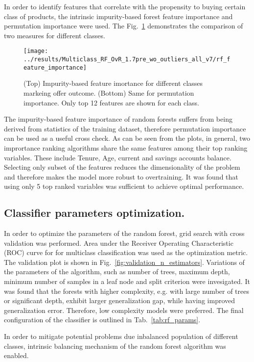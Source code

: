 \documentclass[14pt]{scrartcl}
\begin{document}
In order to identify features that correlate with the propensity to buying certain
class of products, the intrinsic impurity-based forest feature importance and permutation
importance were used. The Fig.~\ref{fig:feature_importance} demonstrates the comparison
of two measures for different classes.
\begin{figure}[htpb!]
    \centering
    \texttt{[image: ../results/Multiclass\_RF\_OvR\_1.7pre\_wo\_outliers\_all\_v7/rf\_feature\_importance]}\\
    \caption{ (Top) Impurity-based feature imortance for different classes markeing 
    offer outcome. (Bottom) Same for permutation importance. Only top 12 features are
    shown for each class.}
    \label{fig:feature_importance}
 \end{figure}
The impurity-based feature importance of random forests suffers from being derived 
from statistics of the training dataset, therefore permutation importance
can be used as a useful cross check. As can be seen from the plots, in general, two
imprortance ranking algorithms share the same features among their top ranking
variables. These include Tenure, Age, current and savings accounts balance. 
Selecting only subset of the features reduces the dimensionality of the problem and
therefore makes the model more robust to overtraining. It was found that using only 
5 top ranked variables was sufficient to achieve optimal performance.

\subsection{Classifier parameters optimization.}

In order to optimize the parameters of the random forest, grid search with cross validation
was performed. Area under the Receiver Operating Characteristic (ROC) curve for 
for multiclass classification was used as the optimization metric. 
The validation plot is shown in Fig.~\ref{fig:validation_n_estimators}. Variations of the 
parameters of the algorithm, such as number of trees, maximum depth, minimum
number of samples in a leaf node and split criterion were invesigated. It was found
that the forests with higher complexity, e.g. with large number of trees or significant depth,
exhibit larger generalization gap, while having improved generalization
error. Therefore, low complexity models were preferred.
The final configuration of the classifier is outlined in Tab.~\ref{tab:rf_params}.

In order to mitigate potential problems due inbalanced population of different classes,
intrinsic balancing mechanism of the random forest algorithm was enabled.
\end{document}
